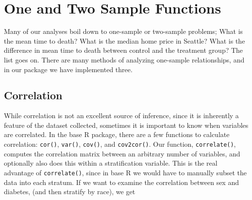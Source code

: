 \documentclass[landscape]{article}
\begin{document}
\section{One and Two Sample Functions}
Many of our analyses boil down to one-sample or two-sample problems; What is the mean time to death? What is the median home price in Seattle? What is the difference in mean time to death between control and the treatment group? The list goes on. There are many methods of analyzing one-sample relationships, and in our package we have implemented three. 
\subsection{Correlation}
While correlation is not an excellent source of inference, since it is inherently a feature of the dataset collected, sometimes it is important to know when variables are correlated. In the base R package, there are a few functions to calculate correlation: \texttt{cor()}, \texttt{var()}, \texttt{cov()}, and \texttt{cov2cor()}. Our function, \texttt{correlate()}, computes the correlation matrix between an arbitrary number of variables, and optionally also does this within a stratification variable. This is the real advantage of \texttt{correlate()}, since in base R we would have to manually subset the data into each stratum. If we want to examine the correlation between sex and diabetes, (and then stratify by race), we get
\end{document}
